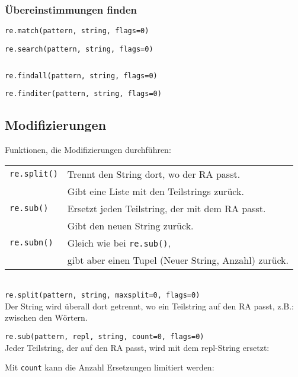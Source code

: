 \subsubsection{Übereinstimmungen finden}
\begin{minipage}[t]{0.49\textwidth}
	\texttt{re.match(pattern, string, flags=0)}
	
	\texttt{re.search(pattern, string, flags=0)}
	
	
\end{minipage}
\begin{minipage}[t]{0.02\textwidth} $ \quad $\end{minipage}
\begin{minipage}[t]{0.49\textwidth}
	\texttt{re.findall(pattern, string, flags=0)}
	
	\texttt{re.finditer(pattern, string, flags=0)}
	
\end{minipage}


\subsection{Modifizierungen}
Funktionen, die Modifizierungen durchführen:\\
\begin{tabular}{ll}
	\texttt{re.split()}& Trennt den String dort, wo der RA passt.\\
	& Gibt eine Liste mit den Teilstrings zurück.\\
	\texttt{re.sub()}& Ersetzt jeden Teilstring, der mit dem RA passt.\\
	& Gibt den neuen String zurück.\\
	\texttt{re.subn()}& Gleich wie bei \texttt{re.sub()},\\
	& gibt aber einen Tupel (Neuer String, Anzahl) zurück.\\
\end{tabular}\\[10pt]
\texttt{re.split(pattern, string, maxsplit=0, flags=0)}\\
Der String wird überall dort getrennt, wo ein Teilstring auf den RA passt, z.B.: zwischen den Wörtern.

\texttt{re.sub(pattern, repl, string, count=0, flags=0)}\\
Jeder Teilstring, der auf den RA passt, wird mit dem repl-String ersetzt:

Mit \texttt{count} kann die Anzahl Ersetzungen limitiert werden:


